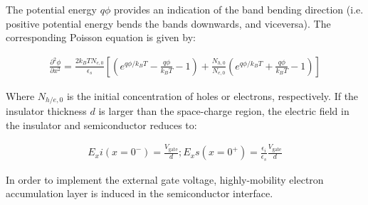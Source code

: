 The potential energy $q\phi$ provides an indication of the band bending direction (i.e. positive potential energy bends the bands downwards, and viceversa). The corresponding Poisson equation is given by:

\begin{align}
\frac{\partial^2 \phi}{\partial x^2} = \frac{2 k_B T N_{e,0}}{\epsilon_s} 
\left[ \left( e^{q\phi /k_B T} - \frac{q\phi}{k_B T} - 1 \right) +
\frac{N_{h,0}}{N_{e,0}}  \left( e^{q\phi /k_B T} + \frac{q\phi}{k_B T} - 1 \right) 
\right]
\end{align}

Where $N_{h/e,0}$ is the initial concentration of holes or electrons, respectively. If the insulator thickness $d$ is larger than the space-charge region, the electric field in the insulator and semiconductor reduces to:

\begin{align}
E_xi(x=0^-) = \frac{V_\text{gate}}{d}; E_xs(x=0^+) = \frac{\epsilon_i}{\epsilon_s} \frac{V_\text{gate}}{d}
\end{align}

In order to implement the external gate voltage, highly-mobility electron accumulation layer is induced in the semiconductor interface. %




